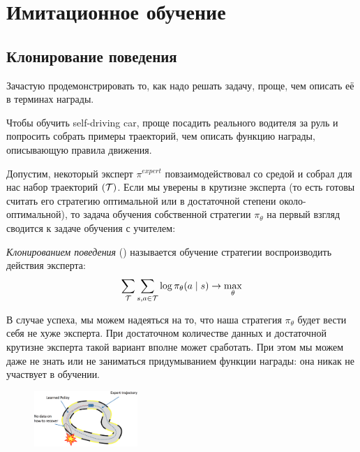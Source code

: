 \section{Имитационное обучение}

\subsection{Клонирование поведения}

Зачастую продемонстрировать то, как надо решать задачу, проще, чем описать её в терминах награды.

\begin{example}
Чтобы обучить self-driving car, проще посадить реального водителя за руль и попросить собрать примеры траекторий, чем описать функцию награды, описывающую правила движения.
\end{example}

Допустим, некоторый эксперт $\pi^{expert}$ повзаимодействовал со средой и собрал для нас набор траекторий $(\mathcal{T})$. Если мы уверены в крутизне эксперта (то есть готовы считать его стратегию оптимальной или в достаточной степени около-оптимальной), то задача обучения собственной стратегии $\pi_{\theta}$ на первый взгляд сводится к задаче обучения с учителем:

\begin{definition}
\emph{Клонированием поведения} () называется обучение стратегии воспроизводить действия эксперта:
$$\sum_{\mathcal{T}} \sum_{s, a \in \mathcal{T}} \log \pi_{\theta}(a \mid s) \to \max_{\theta}$$
\end{definition}

В случае успеха, мы можем надеяться на то, что наша стратегия $\pi_{\theta}$ будет вести себя не хуже эксперта. При достаточном количестве данных и достаточной крутизне эксперта такой вариант вполне может сработать. При этом мы можем даже не знать или не заниматься придумыванием функции награды: она никак не участвует в обучении.

\begin{figure}
\vspace{-0.4cm}
\centering
\includegraphics[width=0.35\textwidth]{Images/behavioralclonning.png}
\vspace{-0.5cm}
\end{figure}

